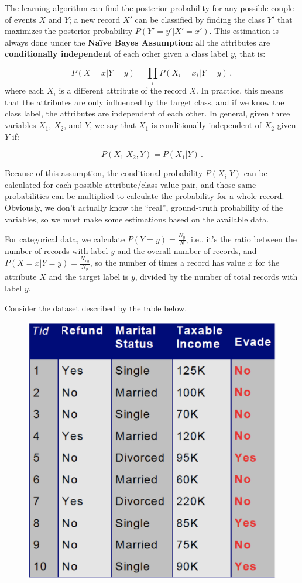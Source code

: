 The learning algorithm can find the posterior probability for any possible couple of events $X$ and $Y$; a new record $X'$ can be classified by finding the class $Y'$ that maximizes the posterior probability $P(Y'=y'|X'=x')$. This estimation is always done under the \textbf{Naïve Bayes Assumption}: all the attributes are \textbf{conditionally independent} of each other given a class label $y$, that is:

\begin{equation*}
    P(X=x|Y=y) = \prod_i P(X_i = x_i|Y=y) \, ,
\end{equation*}
where each $X_i$ is a different attribute of the record $X$. In practice, this means that the attributes are only influenced by the target class, and if we know the class label, the attributes are independent of each other. In general, given three variables $X_1$, $X_2$, and $Y$, we say that $X_1$ is conditionally independent of $X_2$ given $Y$ if:

\begin{equation*}
    P(X_1 | X_2,Y) = P(X_1|Y) \, .
\end{equation*}

Because of this assumption, the conditional probability $P(X_i | Y)$ can be calculated for each possible attribute/class value pair, and those same probabilities can be multiplied to calculate the probability for a whole record. Obviously, we don't actually know the ``real'', ground-truth probability of the variables, so we must make some estimations based on the available data.

For categorical data, we calculate $P(Y=y) = \frac{N_y}{N}$, i.e., it's the ratio between the number of records with label $y$ and the overall number of records, and $P(X=x|Y=y) = \frac{N_{xy}}{N_y}$, so the number of times a record has value $x$ for the attribute $X$ and the target label is $y$, divided by the number of total records with label $y$.

Consider the dataset described by the table below.
\begin{figure}[ht]
    \centering
    \includegraphics[width=0.5\linewidth]{img/NBC.png} 
\end{figure}

